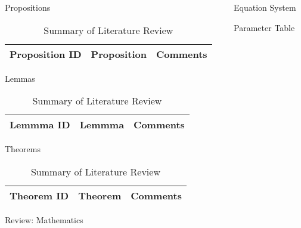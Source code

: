 \begin{frame}[t]
\begin{columns}[t]
\begin{column}{\onecolwid}
\begin{alertblock}{Propositions}
\begin{table}[H]
	\centering
	\begin{tabular}{r|p{12cm}|l}
	\hline
	Proposition ID  & Proposition & Comments \\
	\hline
	\hline
	\end{tabular}
	\caption{Summary of Literature Review}
\end{table} 


\end{alertblock}
\begin{alertblock}{Lemmas}

\begin{table}[H]
	\centering
	\begin{tabular}{r|p{12cm}|l}
	\hline
	Lemmma ID  & Lemmma & Comments \\
	\hline
	\hline
	\end{tabular}
	\caption{Summary of Literature Review}
\end{table} 


\end{alertblock}
\begin{alertblock}{Theorems}

\begin{table}[H]
	\centering
	\begin{tabular}{r|p{12cm}|l}
	\hline
	Theorem ID  & Theorem & Comments \\
	\hline
	\hline
	\end{tabular}
	\caption{Summary of Literature Review}
\end{table} 


\end{alertblock}
\begin{alertblock}{Review: Mathematics}
\end{alertblock}
\end{column}
\begin{column}{\onecolwid} %
\begin{alertblock}{Equation System}
\end{alertblock}
\begin{alertblock}{Parameter Table}


\end{alertblock}
\end{column}
\end{columns}
\end{frame}
